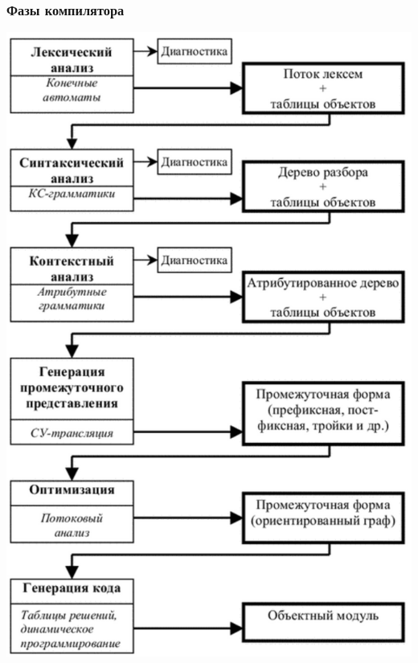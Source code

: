 \documentclass[xetex,mathserif,serif]{beamer}
\begin{document}
    \begin{frame}
        \frametitle{Фазы компилятора}
        \begin{center}
            \includegraphics[height=0.8\textheight]{compilerPhases.png}
        \end{center}
    \end{frame}
\end{document}

